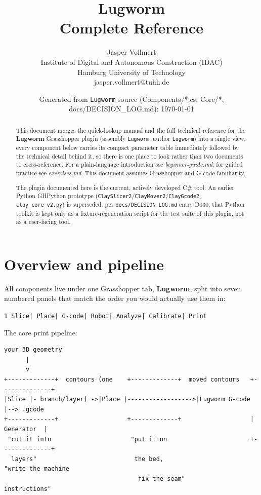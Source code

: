 \documentclass[11pt]{article}
\title{\color{lugwormblue}\textbf{Lugworm}\\[0.3em]\Large Complete Reference}
\author{Jasper Vollmert \\ \small Institute of Digital and Autonomous Construction (IDAC) \\ \small Hamburg University of Technology \\ \small jasper.vollmert@tuhh.de}
\date{\small Generated from \texttt{Lugworm} source (Components/*.cs, Core/*, docs/DECISION\_LOG.md): \today}
\newcommand{\param}[1]{\texttt{#1}}
\begin{document}
\maketitle

\begin{abstract}
\noindent This document merges the quick-lookup manual and the full
technical reference for the \textbf{Lugworm} Grasshopper plugin
(assembly \param{Lugworm}, author \param{Lugworm}) into a single
view: every component below carries its compact parameter table
immediately followed by the technical detail behind it, so there is one
place to look rather than two documents to cross-reference. For a
plain-language introduction see \emph{beginner-guide.md}; for guided
practice see \emph{exercises.md}. This document assumes Grasshopper and
G-code familiarity.

The plugin documented here is the current, actively developed C\# tool.
An earlier Python GHPython prototype
(\param{ClaySlicer2}/\param{ClayMover2}/\param{ClayGcode2},
\param{clay\_core\_v2.py}) is superseded: per
\param{docs/DECISION\_LOG.md} entry D030, that Python toolkit is kept
only as a fixture-regeneration script for the test suite of this plugin, not
as a user-facing tool.
\end{abstract}

\tableofcontents
\newpage

\section{Overview and pipeline}

All components live under one Grasshopper tab, \textbf{Lugworm}, split
into seven numbered panels that match the order you would actually use
them in:

\begin{center}
\texttt{1 Slice\quad| Place\quad| G-code\quad| Robot\quad| Analyze\quad| Calibrate\quad| Print}
\end{center}

The core print pipeline:

\begin{verbatim}
your 3D geometry
      |
      v
+-------------+  contours (one    +-------------+  moved contours   +--------------+
|Slice |- branch/layer) ->|Place |------------------>|Lugworm G-code |--> .gcode
+-------------+                   +-------------+                   |   Generator  |
 "cut it into                      "put it on                       +--------------+
  layers"                           the bed,                         "write the machine
                                     fix the seam"                    instructions"
\end{verbatim}
\end{document}

